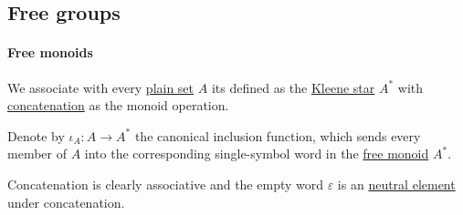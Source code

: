 \subsection{Free groups}\label{subsec:free_groups}

\paragraph{Free monoids}

\begin{definition}\label{def:free_monoid}
  We associate with every \hyperref[def:set]{plain set} \( A \) its  defined as the \hyperref[def:formal_language/kleene_star]{Kleene star} \( A^* \) with \hyperref[def:formal_language/concatenation]{concatenation} as the monoid operation.

  Denote by \( \iota_A: A \to A^* \) the canonical inclusion function, which sends every member of \( A \) into the corresponding single-symbol word in the \hyperref[def:free_monoid]{free monoid} \( A^* \).
\end{definition}
\begin{defproof}
  Concatenation is clearly associative and the empty word \( \varepsilon \) is an \hyperref[def:monoid]{neutral element} under concatenation.
\end{defproof}

